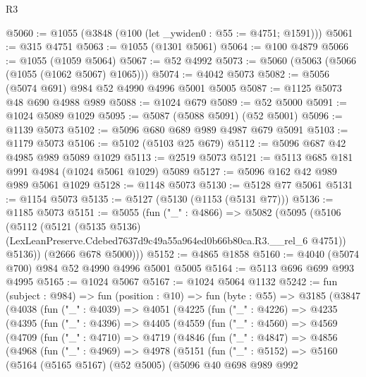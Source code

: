 \begin{lexlean}{R3}
\begin{coremodule}
@5060 := @1055 (@3848 (@100 (let _ywiden0 : @55 := @4751; @1591)))
@5061 := @315 @4751
@5063 := @1055 (@1301 @5061)
@5064 := @100 @4879
@5066 := @1055 (@1059 @5064)
@5067 := @52 @4992
@5073 := @5060 (@5063 (@5066 (@1055 (@1062 @5067) @1065)))
@5074 := @4042 @5073
@5082 := @5056 (@5074 @691) @984 @52 @4990 @4996 @5001 @5005
@5087 := @1125 @5073 @48 @690 @4988 @989
@5088 := @1024 @679
@5089 := @52 @5000
@5091 := @1024 @5089 @1029
@5095 := @5087 (@5088 @5091) (@52 @5001)
@5096 := @1139 @5073
@5102 := @5096 @680 @689 @989 @4987 @679 @5091
@5103 := @1179 @5073
@5106 := @5102 (@5103 @25 @679)
@5112 := @5096 @687 @42 @4985 @989 @5089 @1029
@5113 := @2519 @5073
@5121 := @5113 @685 @181 @991 @4984 (@1024 @5061 @1029) @5089
@5127 := @5096 @162 @42 @989 @989 @5061 @1029
@5128 := @1148 @5073
@5130 := @5128 @77 @5061
@5131 := @1154 @5073
@5135 := @5127 (@5130 (@1153 (@5131 @77)))
@5136 := @1185 @5073
@5151 := @5055
    (fun ("_" : @4866) =>
    @5082
      (@5095
        (@5106
          (@5112
            (@5121
              (@5135 @5136)
              (LexLeanPreserve.Cdebed7637d9c49a55a964ed0b66b80ca.R3.__rel_6 @4751))
            @5136))
        (@2666 @678 @5000)))
@5152 := @4865 @1858
@5160 := @4040 (@5074 @700) @984 @52 @4990 @4996 @5001 @5005
@5164 := @5113 @696 @699 @993 @4995
@5165 := @1024 @5067
@5167 := @1024 @5064 @1132
@5242 := fun (subject : @984) =>
  fun (position : @10) =>
  fun (byte : @55) =>
  @3185
    (@3847
      (@4038
        (fun ("_" : @4039) =>
        @4051
          (@4225
            (fun ("_" : @4226) =>
            @4235
              (@4395
                (fun ("_" : @4396) =>
                @4405
                  (@4559
                    (fun ("_" : @4560) =>
                    @4569
                      (@4709
                        (fun ("_" : @4710) =>
                        @4719
                          (@4846
                            (fun ("_" : @4847) =>
                            @4856
                              (@4968
                                (fun ("_" : @4969) =>
                                @4978
                                  (@5151
                                    (fun ("_" : @5152) =>
                                    @5160
                                      (@5164
                                        (@5165 @5167)
                                        (@52 @5005)
                                        (@5096
                                          @40
                                          @698
                                          @989
                                          @992

\end{coremodule}
\end{lexlean}
